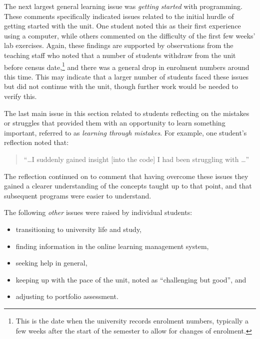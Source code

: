 The next largest general learning issue was \emph{getting started} with programming. These comments specifically indicated issues related to the initial hurdle of getting started with the unit. One student noted this as their first experience using a computer, while others commented on the difficulty of the first few weeks' lab exercises. Again, these findings are supported by observations from the teaching staff who noted that a number of students withdraw from the unit before census date,\footnote{This is the date when the university records enrolment numbers, typically a few weeks after the start of the semester to allow for changes of enrolment.} and there was a general drop in enrolment numbers around this time. This may indicate that a larger number of students faced these issues but did not continue with the unit, though further work would be needed to verify this.


The last main issue in this section related to students reflecting on the mistakes or struggles that provided them with an opportunity to learn something important, referred to as \emph{learning through mistakes}. For example, one student's reflection noted that:

\begin{quote}
``\ldots I suddenly gained insight [into the code] I had been struggling with \ldots''
\end{quote}

\noindent The reflection continued on to comment that having overcome these issues they gained a clearer understanding of the concepts taught up to that point, and that subsequent programs were easier to understand. 

The following \emph{other} issues were raised by individual students: 
\begin{itemize}[noitemsep,nolistsep]
	\item transitioning to university life and study,
	\item finding information in the online learning management system,
	\item seeking help in general,
	\item keeping up with the pace of the unit, noted as ``challenging but good'', and
	\item adjusting to portfolio assessment.
\end{itemize}

